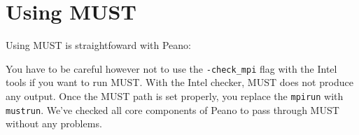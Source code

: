 \section{Using MUST}
\label{section:supercomputers:MUST}

Using MUST is straightfoward with Peano:


\noindent
You have to be careful however not to use the \texttt{-check\_mpi} flag with the
Intel tools if you want to run MUST.
With the Intel checker, MUST does not produce any output.
Once the MUST path is set properly, you replace the \texttt{mpirun} with
\texttt{mustrun}.
We've checked all core components of Peano to pass through MUST without any
problems.


% 
% 

 
% 
% 
% 
% 
% 
% 
% 
% 
% 
% 
% 
% 
% 
